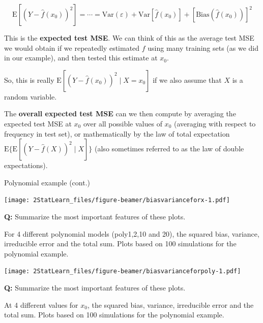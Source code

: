\documentclass[ignorenonframetext,]{beamer}
\begin{document}
\begin{frame}

\[\text{E}[(Y - \hat{f}(x_0))^2]=\cdots=\text{Var}(\varepsilon) +  \text{Var}[\hat{f}(x_0)]+[\text{Bias}(\hat{f}(x_0))]^2\]

This is the \textbf{expected test MSE}. We can think of this as the
average test MSE we would obtain if we repeatedly estimated \(f\) using
many training sets (as we did in our example), and then tested this
estimate at \(x_0\).

So, this is really \(\text{E}[(Y - \hat{f}(x_0))^2 \mid X=x_0]\) if we
also assume that \(X\) is a random variable.

The \textbf{overall expected test MSE} can we then compute by averaging
the expected test MSE at \(x_0\) over all possible values of \(x_0\)
(averaging with respect to frequency in test set), or mathematically by
the law of total expectation
\(\text{E} \{ \text{E}[(Y - \hat{f}(X))^2 \mid X]\}\) (also sometimes
referred to as the law of double expectations).

\end{frame}

\begin{frame}

\begin{block}{Polynomial example (cont.)}

\texttt{[image: 2StatLearn\_files/figure-beamer/biasvarianceforx-1.pdf]}

\textbf{Q:} Summarize the most important features of these plots.

For 4 different polynomial models (poly1,2,10 and 20), the squared bias,
variance, irreducible error and the total sum. Plots based on 100
simulations for the polynomial example.

\end{block}

\end{frame}

\begin{frame}

\texttt{[image: 2StatLearn\_files/figure-beamer/biasvarianceforpoly-1.pdf]}

\textbf{Q:} Summarize the most important features of these plots.

At 4 different values for \(x_0\), the squared bias, variance,
irreducible error and the total sum. Plots based on 100 simulations for
the polynomial example.

\end{frame}
\end{document}
